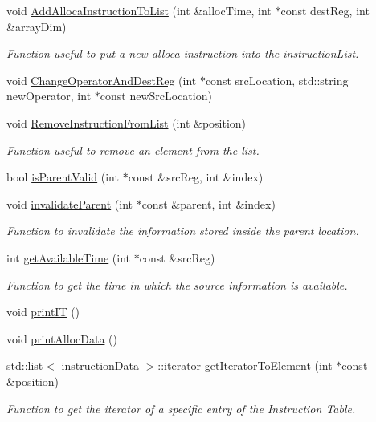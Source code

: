 \begin{DoxyCompactItemize}
void \hyperlink{classoctantis_1_1InstructionTable_a17f91da7d0bbe7140af7f9a2fcc1527b}{Add\+Alloca\+Instruction\+To\+List} (int \&alloc\+Time, int $\ast$const dest\+Reg, int \&array\+Dim)
\begin{DoxyCompactList}\small\item\em Function useful to put a new alloca instruction into the instruction\+List. \end{DoxyCompactList}\item 
void \hyperlink{classoctantis_1_1InstructionTable_a938ebc5835b19c35178c27e635085c18}{Change\+Operator\+And\+Dest\+Reg} (int $\ast$const src\+Location, std\+::string new\+Operator, int $\ast$const new\+Src\+Location)
\item 
void \hyperlink{classoctantis_1_1InstructionTable_a30b7f55d07699df52d48822ea4f886b4}{Remove\+Instruction\+From\+List} (int \&position)
\begin{DoxyCompactList}\small\item\em Function useful to remove an element from the list. \end{DoxyCompactList}\item 
bool \hyperlink{classoctantis_1_1InstructionTable_afb6d1bf3c1ae3301c2b61ceca1e06153}{is\+Parent\+Valid} (int $\ast$const \&src\+Reg, int \&index)
\item 
void \hyperlink{classoctantis_1_1InstructionTable_a0777d603ab5fac8ccdfea77800c40464}{invalidate\+Parent} (int $\ast$const \&parent, int \&index)
\begin{DoxyCompactList}\small\item\em Function to invalidate the information stored inside the parent location. \end{DoxyCompactList}\item 
int \hyperlink{classoctantis_1_1InstructionTable_a1c2294b6a66fb8811b09380678f8881c}{get\+Available\+Time} (int $\ast$const \&src\+Reg)
\begin{DoxyCompactList}\small\item\em Function to get the time in which the source information is available. \end{DoxyCompactList}\item 
void \hyperlink{classoctantis_1_1InstructionTable_a949d0ad63e3f990f845fdb632b4c97fa}{print\+IT} ()
\item 
void \hyperlink{classoctantis_1_1InstructionTable_a0ed0b3774f3551c6a1161394a33ea8d3}{print\+Alloc\+Data} ()
\item 
std\+::list$<$ \hyperlink{structoctantis_1_1InstructionTable_1_1instructionData}{instruction\+Data} $>$\+::iterator \hyperlink{classoctantis_1_1InstructionTable_a6894d7162a4f2aeb64de48a6c7f0e8ca}{get\+Iterator\+To\+Element} (int $\ast$const \&position)
\begin{DoxyCompactList}\small\item\em Function to get the iterator of a specific entry of the Instruction Table. \end{DoxyCompactList}\end{DoxyCompactItemize}

